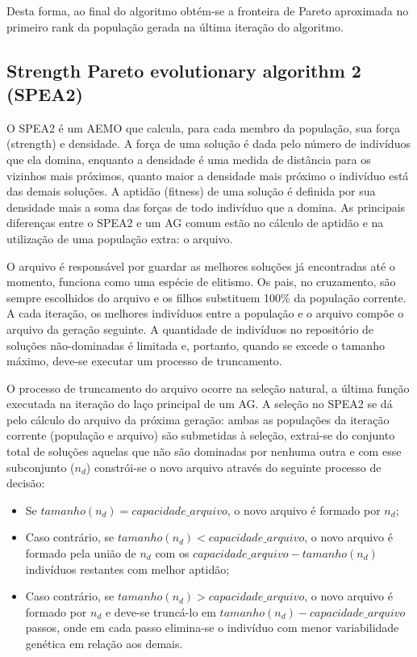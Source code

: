 Desta forma, ao final do algoritmo obtém-se a fronteira de Pareto aproximada no primeiro rank da população gerada na última iteração do algoritmo.

\subsection{Strength Pareto evolutionary algorithm 2 (SPEA2)}

O SPEA2 é um AEMO que calcula, para cada membro da população, sua força (strength) e densidade. A força de uma solução é dada pelo número de indivíduos que ela domina, enquanto a densidade é uma medida de distância para os vizinhos mais próximos, quanto maior a densidade mais próximo o indivíduo está das demais soluções. A aptidão (fitness) de uma solução é definida por sua densidade mais a soma das forças de todo indivíduo que a domina. As principais diferenças entre o SPEA2 e um AG comum estão no cálculo de aptidão e na utilização de uma população extra: o arquivo.

O arquivo é responsável por guardar as melhores soluções já encontradas até o momento, funciona como uma espécie de elitismo. Os pais, no cruzamento, são sempre escolhidos do arquivo e os filhos substituem 100\% da população corrente. A cada iteração, os melhores indivíduos entre a população e o arquivo compõe o arquivo da geração seguinte. A quantidade de indivíduos no repositório de soluções não-dominadas é limitada e, portanto, quando se excede o tamanho máximo, deve-se executar um processo de truncamento.

O processo de truncamento do arquivo ocorre na seleção natural, a última função executada na iteração do laço principal de um AG. A seleção no SPEA2 se dá pelo cálculo do arquivo da próxima geração: ambas as populações da iteração corrente (população e arquivo) são submetidas à seleção, extrai-se do conjunto total de soluções aquelas que não são dominadas por nenhuma outra e com esse subconjunto ($n_d$) constrói-se o novo arquivo através do seguinte processo de decisão:

\begin{itemize}  
	\item Se $tamanho(n_d) = capacidade\_arquivo$, o novo arquivo é formado por $n_d$;
	\item Caso contrário, se $tamanho(n_d) < capacidade\_arquivo$, o novo arquivo é formado pela união de $n_d$ com os $capacidade\_arquivo - tamanho(n_d)$ indivíduos restantes com melhor aptidão;
	\item Caso contrário, se $tamanho(n_d) > capacidade\_arquivo$, o novo arquivo é formado por $n_d$ e deve-se truncá-lo em $tamanho(n_d) - capacidade\_arquivo$ passos, onde em cada passo elimina-se o indivíduo com menor variabilidade genética em relação aos demais.
\end{itemize}

